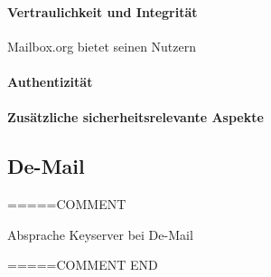\documentclass  [paper=a4,
				fontsize=12pt,
				listof=totoc,
				bibliography=totoc
				]{scrreprt}
\begin{document}
				\paragraph{Vertraulichkeit und Integrität}
					Mailbox.org bietet seinen Nutzern
					
				\paragraph{Authentizität}
					
				\paragraph{Zusätzliche sicherheitsrelevante Aspekte}
					
					
					
			\subsection{De-Mail}
			
			=====COMMENT
			
			Absprache Keyserver bei De-Mail
			
			=====COMMENT END
			
\end{document}
